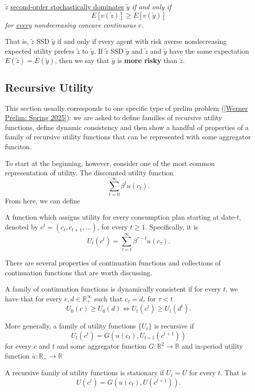 \documentclass[11pt,english]{article}
\begin{document}
\begin{theorem}[Theorem 18.5]
$\tilde{z}$ \underline{second-order stochastically dominates} $\tilde{y}$
\textit{if and only if}
\[
    E[v(\tilde{z})] \geq E[v(\tilde{y})]
\]
\textit{for \underline{every} nondecreasing concave continuous $v$.}
\end{theorem}
That is, $\tilde{z}$ SSD $\tilde{y}$ if and only if every agent with risk
averse nondecreasing expected utility prefers $\tilde{z}$ to $\tilde{y}$. If $\tilde{z}$ SSD $\tilde{y}$ and $\tilde{z}$ and $\tilde{y}$ have the same
expectation $E(\tilde{z}) = E(\tilde{y})$, then we say that $\tilde{y}$ is
\textbf{more risky} than $\tilde{z}$.


\subsection{Recursive Utility}

This section usually corresponds to one specific type of prelim problem (\ref{Werner Prelim: Spring 2025}): we are asked to define families of recursive utility functions, define dynamic consistency and then show a handful of properties of a family of recursive utility functions that can be represented with some aggregator funciton. 

To start at the beginning, however, consider one of the most common representation of utility. The discounted utility function
$$\sum_{t=0}^\infty \beta^t u(c_t).$$ From here, we can define
\begin{definition}
A function which assigns utility for every consumption plan starting at date-$t$, denoted by $c^t = (c_t, c_{t+1}, \ldots)$, for every $t\geq 1$. Specifically, it is $$U_t(c^t) = \sum_{\tau = t}^\infty \beta^{\tau - t}u(c_\tau).$$
\end{definition}
There are several properties of continuation functions and collections of continuation functions that are worth discussing.
\begin{definition}
A family of continuation functions is dynamically consistent if for every $t$, we have that for every $c,d\in \mathbb{R}_+^\infty$ such that $c_\tau = d_\tau$ for $\tau < t$ $$U_0(c) \geq U_0(d) \Longleftrightarrow U_t(c^t) \geq U_t(d^t).$$
\end{definition}

\begin{definition}
More generally, a family of utility functions $\{U_t\}$ is recursive if $$U_t(c^t) = G(u(c_t), U_{t+1}(c^{t+1}))$$for every $c$ and $t$ and some aggregator function $G:\mathbb{R}^2 \to \mathbb{R}$ and in-period utility function $u:\mathbb{R}_+\to \mathbb{R}$

A recursive family of utility functions is stationary if $U_t = U$ for every $t$. That is $$U(c^t) = G(u(c_t), U(c^{t+1})).$$
\end{definition}
\end{document}
